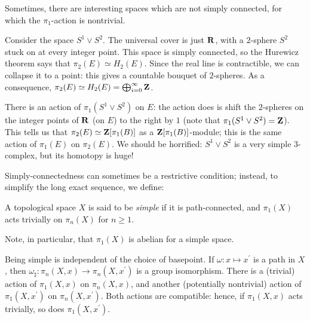 Sometimes, there are interesting spaces which are not simply connected, for which the $\pi_1$-action is nontrivial.
\begin{example}
    Consider the space $S^1\vee S^2$.
    The universal cover is just $\mathbf R$, with a $2$-sphere $S^2$ stuck on at every integer point.
    This space is simply connected, so the Hurewicz theorem says that $\pi_2(E)\simeq H_2(E)$.
    Since the real line is contractible, we can collapse it to a point: this gives a countable bouquet of $2$-spheres.
    As a consequence, $\pi_2(E)\simeq H_2(E) = \bigoplus_{i=0}^\infty \mathbf Z$.

    There is an action of $\pi_1(S^1\vee S^2)$ on $E$: the action does is shift the $2$-spheres on the integer points of $\mathbf R$ (on $E$) to the right by $1$ (note that $\pi_1(S^1\vee S^2) = \mathbf Z$).
    This tells us that $\pi_2(E) \simeq \mathbf Z[\pi_1(B)]$ as a $\mathbf Z[\pi_1(B)]$-module; this is the same action of $\pi_1(E)$ on
    $\pi_2(E)$.
    We should be horrified: $S^1\vee S^2$ is a very simple $3$-complex, but its homotopy is huge!
\end{example}
Simply-connectedness can sometimes be a restrictive condition; instead, to simplify the long exact sequence, we define:
\begin{definition}
    A topological space $X$ is said to be \emph{simple} if it is path-connected, and
    $\pi_1(X)$ acts trivially on $\pi_n(X)$ for $n\geq 1$.
\end{definition}
Note, in particular, that $\pi_1(X)$ is abelian for a simple space.

Being simple is independent of the choice of basepoint. If $\omega:x\mapsto x^\prime$ is a path in $X$,
then $\omega_\sharp:\pi_n(X,x)\to \pi_n(X,x^\prime)$ is a group isomorphism.
There is a (trivial) action of $\pi_1(X,x)$ on $\pi_n(X,x)$, and another (potentially nontrivial)
action of $\pi_1(X,x^\prime)$ on $\pi_n(X,x^\prime)$.
Both actions are compatible: hence, if $\pi_1(X,x)$ acts trivially, so does $\pi_1(X,x^\prime)$.

